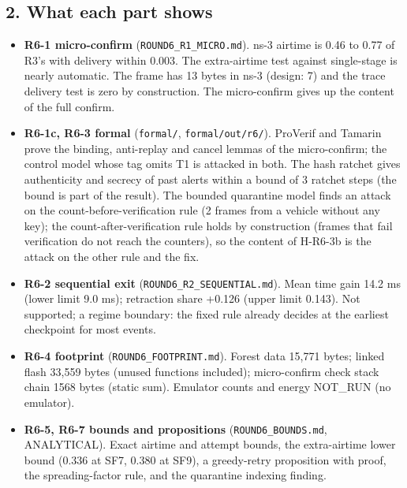 \subsection*{2. What each part shows}

\begin{itemize}
\item \textbf{R6-1 micro-confirm} (\texttt{ROUND6\_R1\_MICRO.md}). ns-3 airtime is 0.46 to 0.77 of R3's with delivery within 0.003. The extra-airtime test against single-stage is nearly automatic. The frame has 13 bytes in ns-3 (design: 7) and the trace delivery test is zero by construction. The micro-confirm gives up the content of the full confirm.
\item \textbf{R6-1c, R6-3 formal} (\texttt{formal/}, \texttt{formal/out/r6/}). ProVerif and Tamarin prove the binding, anti-replay and cancel lemmas of the micro-confirm; the control model whose tag omits T1 is attacked in both. The hash ratchet gives authenticity and secrecy of past alerts within a bound of 3 ratchet steps (the bound is part of the result). The bounded quarantine model finds an attack on the count-before-verification rule (2 frames from a vehicle without any key); the count-after-verification rule holds by construction (frames that fail verification do not reach the counters), so the content of H-R6-3b is the attack on the other rule and the fix.
\item \textbf{R6-2 sequential exit} (\texttt{ROUND6\_R2\_SEQUENTIAL.md}). Mean time gain 14.2 ms (lower limit 9.0 ms); retraction share +0.126 (upper limit 0.143). Not supported; a regime boundary: the fixed rule already decides at the earliest checkpoint for most events.
\item \textbf{R6-4 footprint} (\texttt{ROUND6\_FOOTPRINT.md}). Forest data 15,771 bytes; linked flash 33,559 bytes (unused functions included); micro-confirm check stack chain 1568 bytes (static sum). Emulator counts and energy NOT\_RUN (no emulator).
\item \textbf{R6-5, R6-7 bounds and propositions} (\texttt{ROUND6\_BOUNDS.md}, ANALYTICAL). Exact airtime and attempt bounds, the extra-airtime lower bound (0.336 at SF7, 0.380 at SF9), a greedy-retry proposition with proof, the spreading-factor rule, and the quarantine indexing finding.
\end{itemize}

